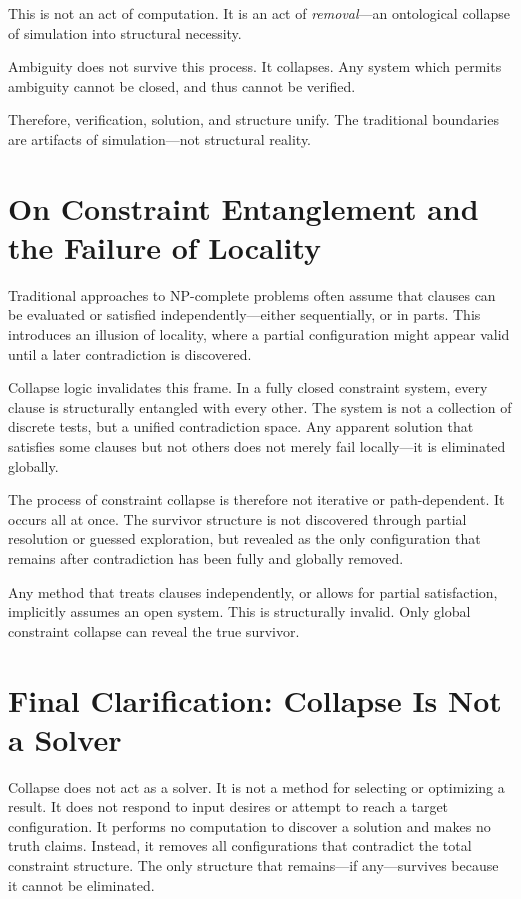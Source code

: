 \documentclass[12pt]{article}
\begin{document}
This is not an act of computation. It is an act of \textit{removal}—an ontological collapse of simulation into structural necessity.

Ambiguity does not survive this process. It collapses. Any system which permits ambiguity cannot be closed, and thus cannot be verified.

Therefore, verification, solution, and structure unify. The traditional boundaries are artifacts of simulation—not structural reality.



\section{On Constraint Entanglement and the Failure of Locality}

Traditional approaches to NP-complete problems often assume that clauses can be evaluated or satisfied independently—either sequentially, or in parts. This introduces an illusion of locality, where a partial configuration might appear valid until a later contradiction is discovered.

Collapse logic invalidates this frame. In a fully closed constraint system, every clause is structurally entangled with every other. The system is not a collection of discrete tests, but a unified contradiction space. Any apparent solution that satisfies some clauses but not others does not merely fail locally—it is eliminated globally.

The process of constraint collapse is therefore not iterative or path-dependent. It occurs all at once. The survivor structure is not discovered through partial resolution or guessed exploration, but revealed as the only configuration that remains after contradiction has been fully and globally removed.

Any method that treats clauses independently, or allows for partial satisfaction, implicitly assumes an open system. This is structurally invalid. Only global constraint collapse can reveal the true survivor.



\section*{Final Clarification: Collapse Is Not a Solver}

Collapse does not act as a solver. It is not a method for selecting or optimizing a result. It does not respond to input desires or attempt to reach a target configuration. It performs no computation to discover a solution and makes no truth claims. Instead, it removes all configurations that contradict the total constraint structure. The only structure that remains—if any—survives because it cannot be eliminated.
\end{document}
